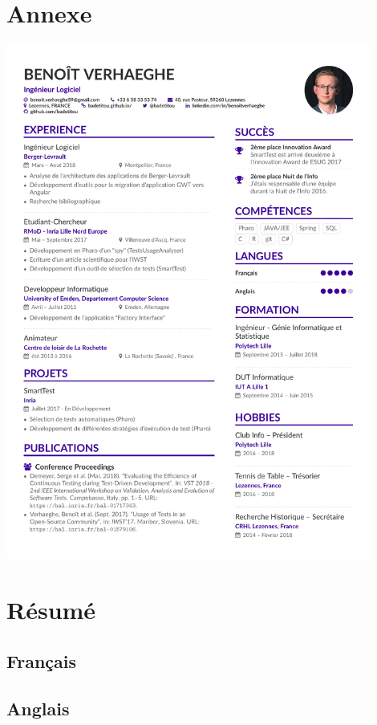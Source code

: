 \newpage

\hypertarget{annexe}{%
\section{Annexe}\label{annexe}}

\includegraphics[width=0.9\textwidth,height=\textheight]{cv/cv.pdf}
\newpage

\hypertarget{ruxe9sumuxe9}{%
\section*{Résumé}\label{ruxe9sumuxe9}}

\hypertarget{franuxe7ais}{%
\subsection*{Français}\label{franuxe7ais}}

\hypertarget{anglais}{%
\subsection*{Anglais}\label{anglais}}
